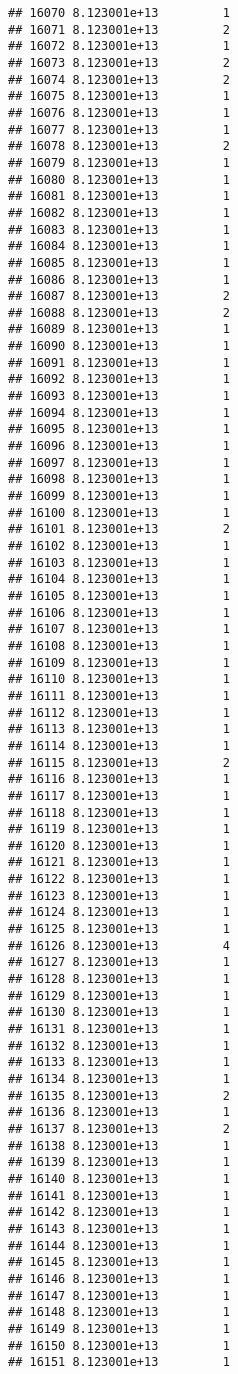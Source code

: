 \documentclass[
]{article}
\begin{document}
\begin{verbatim}
## 16070 8.123001e+13         1
## 16071 8.123001e+13         2
## 16072 8.123001e+13         1
## 16073 8.123001e+13         2
## 16074 8.123001e+13         2
## 16075 8.123001e+13         1
## 16076 8.123001e+13         1
## 16077 8.123001e+13         1
## 16078 8.123001e+13         2
## 16079 8.123001e+13         1
## 16080 8.123001e+13         1
## 16081 8.123001e+13         1
## 16082 8.123001e+13         1
## 16083 8.123001e+13         1
## 16084 8.123001e+13         1
## 16085 8.123001e+13         1
## 16086 8.123001e+13         1
## 16087 8.123001e+13         2
## 16088 8.123001e+13         2
## 16089 8.123001e+13         1
## 16090 8.123001e+13         1
## 16091 8.123001e+13         1
## 16092 8.123001e+13         1
## 16093 8.123001e+13         1
## 16094 8.123001e+13         1
## 16095 8.123001e+13         1
## 16096 8.123001e+13         1
## 16097 8.123001e+13         1
## 16098 8.123001e+13         1
## 16099 8.123001e+13         1
## 16100 8.123001e+13         1
## 16101 8.123001e+13         2
## 16102 8.123001e+13         1
## 16103 8.123001e+13         1
## 16104 8.123001e+13         1
## 16105 8.123001e+13         1
## 16106 8.123001e+13         1
## 16107 8.123001e+13         1
## 16108 8.123001e+13         1
## 16109 8.123001e+13         1
## 16110 8.123001e+13         1
## 16111 8.123001e+13         1
## 16112 8.123001e+13         1
## 16113 8.123001e+13         1
## 16114 8.123001e+13         1
## 16115 8.123001e+13         2
## 16116 8.123001e+13         1
## 16117 8.123001e+13         1
## 16118 8.123001e+13         1
## 16119 8.123001e+13         1
## 16120 8.123001e+13         1
## 16121 8.123001e+13         1
## 16122 8.123001e+13         1
## 16123 8.123001e+13         1
## 16124 8.123001e+13         1
## 16125 8.123001e+13         1
## 16126 8.123001e+13         4
## 16127 8.123001e+13         1
## 16128 8.123001e+13         1
## 16129 8.123001e+13         1
## 16130 8.123001e+13         1
## 16131 8.123001e+13         1
## 16132 8.123001e+13         1
## 16133 8.123001e+13         1
## 16134 8.123001e+13         1
## 16135 8.123001e+13         2
## 16136 8.123001e+13         1
## 16137 8.123001e+13         2
## 16138 8.123001e+13         1
## 16139 8.123001e+13         1
## 16140 8.123001e+13         1
## 16141 8.123001e+13         1
## 16142 8.123001e+13         1
## 16143 8.123001e+13         1
## 16144 8.123001e+13         1
## 16145 8.123001e+13         1
## 16146 8.123001e+13         1
## 16147 8.123001e+13         1
## 16148 8.123001e+13         1
## 16149 8.123001e+13         1
## 16150 8.123001e+13         1
## 16151 8.123001e+13         1

\end{verbatim}
\end{document}
